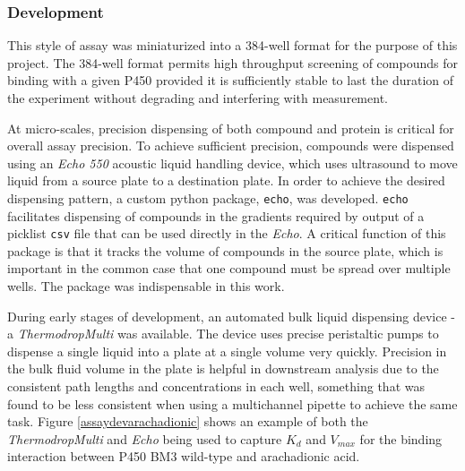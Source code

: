 \documentclass{article}
\begin{document}
\subsubsection{Development}

This style of assay was miniaturized into a 384-well format for the purpose of this project.
The 384-well format permits high throughput screening of compounds for binding with a given P450 provided it is sufficiently stable to last the duration of the experiment without degrading and interfering with measurement.

At micro-scales, precision dispensing of both compound and protein is critical for overall assay precision.
To achieve sufficient precision, compounds were dispensed using an \textit{Echo 550} acoustic liquid handling device, which uses ultrasound to move liquid from a source plate to a destination plate.
In order to achieve the desired dispensing pattern, a custom python package, \texttt{echo}, was developed.
\texttt{echo} facilitates dispensing of compounds in the gradients required by output of a picklist \texttt{csv} file that can be used directly in the \textit{Echo}.
A critical function of this package is that it tracks the volume of compounds in the source plate, which is important in the common case that one compound must be spread over multiple wells.
The package was indispensable in this work.


During early stages of development, an automated bulk liquid dispensing device - a \textit{ThermodropMulti} was available.
The device uses precise peristaltic pumps to dispense a single liquid into a plate at a single volume very quickly.
Precision in the bulk fluid volume in the plate is helpful in downstream analysis due to the consistent path lengths and concentrations in each well, something that was found to be less consistent when using a multichannel pipette to achieve the same task.
Figure \ref{assaydevarachadionic} shows an example of both the \textit{ThermodropMulti} and \textit{Echo} being used to capture $K_d$ and $V_{max}$ for the binding interaction between P450 BM3 wild-type and arachadionic acid.
\end{document}
